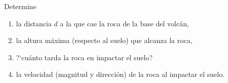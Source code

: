 \begin{enumerate}
Determine

\begin{enumerate}
\item  la distancia $d$ a la que cae la roca de la base del volc\'an,
\item la altura m\'axima (respecto al suelo) que alcanza la roca,
\item ?`cu\'anto tarda la roca en impactar el suelo?
\item la velocidad (magnitud y direcci\'on) de la roca al impactar el suelo.
\end{enumerate}





\end{enumerate}
